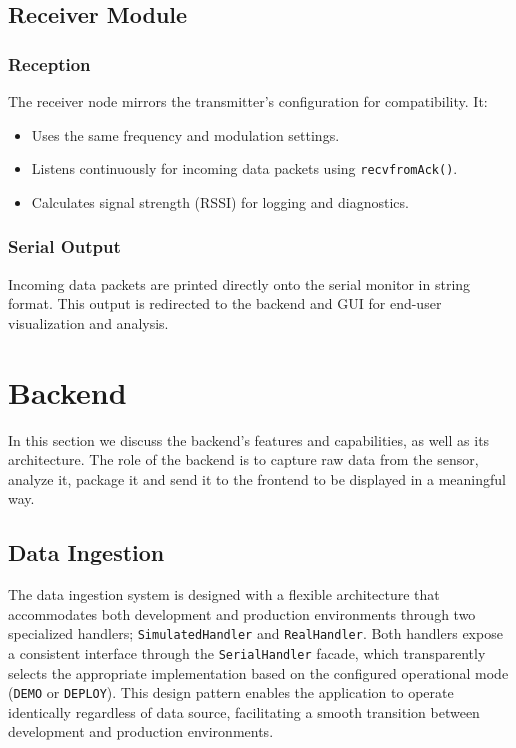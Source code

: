 \documentclass{article}
\begin{document}
\subsection{Receiver Module}
\subsubsection{Reception}
The receiver node mirrors the transmitter's configuration for compatibility. It:
\begin{itemize}
    \item Uses the same frequency and modulation settings.
    \item Listens continuously for incoming data packets using \texttt{recvfromAck()}.
    \item Calculates signal strength (RSSI) for logging and diagnostics.
\end{itemize}

\subsubsection{Serial Output}
Incoming data packets are printed directly onto the serial monitor in string format. This output is redirected to the backend and GUI for end-user visualization and analysis.
\newpage
\section{Backend}
In this section we discuss the backend's features and capabilities, as well as its architecture. The role of the backend is to capture raw data from the sensor, analyze it, package it and send it to the frontend to be displayed in a meaningful way.

\subsection{Data Ingestion}
The data ingestion system is designed with a flexible architecture that accommodates both development and production environments through two specialized handlers; \texttt{SimulatedHandler} and \texttt{RealHandler}. Both handlers expose a consistent interface through the \texttt{SerialHandler} facade, which transparently selects the appropriate implementation based on the configured operational mode (\texttt{DEMO} or \texttt{DEPLOY}). This design pattern enables the application to operate identically regardless of data source, facilitating a smooth transition between development and production environments.
\end{document}
